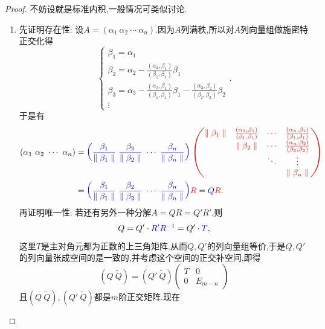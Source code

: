 \documentclass[../../main.tex]{subfiles}%
\begin{document}
\begin{proof}
不妨设就是标准内积,一般情况可类似讨论.
\begin{enumerate}
\item 先证明存在性: 设\( A = (\alpha_1\ \alpha_2\ \cdots\ \alpha_n) \).因为\( A \)列满秩,所以对\( A \)列向量组做施密特正交化得
\[
\begin{cases}
\beta_1 = \alpha_1 \\
\beta_2 = \alpha_2 - \frac{(\alpha_2, \beta_1)}{(\beta_1, \beta_1)} \beta_1 \\
\beta_3 = \alpha_3 - \frac{(\alpha_3, \beta_1)}{(\beta_1, \beta_1)} \beta_1 - \frac{(\alpha_3, \beta_2)}{(\beta_2, \beta_2)} \beta_2 \\
\vdots
\end{cases}.
\]
于是有
\begin{align*}
(\alpha _1\,\,\alpha _2\,\,\cdots \,\,\alpha _n)&={\color{blue} \left( \frac{\beta _1}{\parallel \beta _1\parallel}\,\,\frac{\beta _2}{\parallel \beta _2\parallel}\,\,\cdots \,\,\frac{\beta _n}{\parallel \beta _n\parallel} \right) {\color{red} \left( \begin{matrix}
\parallel \beta _1\parallel&		\frac{\left( \alpha _2,\beta _1 \right)}{\left( \beta _1,\beta _1 \right)}&		\cdots&		\frac{\left( \alpha _n,\beta _1 \right)}{\left( \beta _1,\beta _1 \right)}\\
&		\parallel \beta _2\parallel&		\cdots&		\frac{\left( \alpha _n,\beta _2 \right)}{\left( \beta _2,\beta _2 \right)}\\
&		&		\ddots&		\vdots\\
&		&		&		\parallel \beta _n\parallel\\
\end{matrix} \right)}}
\\
&={\color{blue} \left( \frac{\beta _1}{\parallel \beta _1\parallel}\,\,\frac{\beta _2}{\parallel \beta _2\parallel}\,\,\cdots \,\,\frac{\beta _n}{\parallel \beta _n\parallel} \right) }{\color{red} R}={\color{blue} Q}{\color{red} R}.
\end{align*}
再证明唯一性: 若还有另外一种分解\( A = QR = Q' R' \),则
\[
Q = Q' \cdot {\color{blue} R' R^{-1}} = Q' \cdot {\color{blue} T},
\]
这里\( T \)是主对角元都为正数的上三角矩阵.从而\( Q, Q' \)的列向量组等价,于是\( Q, Q' \)的列向量张成空间的是一致的,并考虑这个空间的正交补空间,即得
\[
(Q\ \widetilde{Q}) = (Q'\ \widetilde{Q}) \begin{pmatrix} T & 0 \\ 0 & E_{m - n} \end{pmatrix}
\]
且\( (Q\ \widetilde{Q}), (Q'\ \widetilde{Q}) \)都是\( m \)阶正交矩阵.现在

\end{enumerate}
\end{proof}
\end{document}

